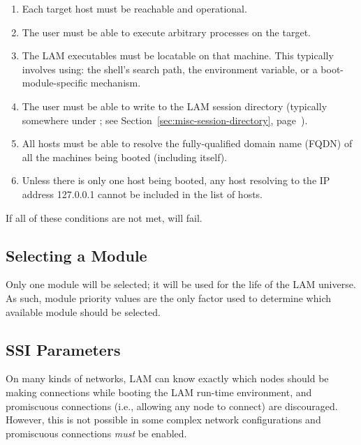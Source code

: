 \begin{enumerate}
\item Each target host must be reachable and operational.
  
\item The user must be able to execute arbitrary processes on the
  target.
  
\item The LAM executables must be locatable on that machine.  This
  typically involves using: the shell's search path, the
   environment variable, or a boot-module-specific
  mechanism.

\item The user must be able to write to the LAM session directory
  (typically somewhere under ; see
  Section~\ref{sec:misc-session-directory},
  page~\pageref{sec:misc-session-directory}).
  
\item All hosts must be able to resolve the fully-qualified domain
  name (FQDN) of all the machines being booted (including itself).
  
\item Unless there is only one host being booted, any host
  resolving to the IP address 127.0.0.1 cannot be included in the list
  of hosts.
\end{enumerate}

If all of these conditions are not met,  will fail.


\subsection{Selecting a  Module}

Only one  module will be selected; it will be used for the
life of the LAM universe.  As such, module priority values are the
only factor used to determine which available module should be
selected.


\subsection{ SSI Parameters}

On many kinds of networks, LAM can know exactly which nodes should be
making connections while booting the LAM run-time environment, and
promiscuous connections (i.e., allowing any node to connect) are
discouraged.  However, this is not possible in some complex network
configurations and promiscuous connections {\em must} be enabled.
  

